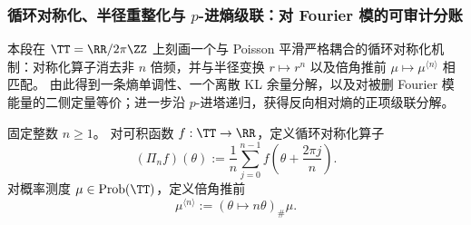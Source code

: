 \subsubsection{循环对称化、半径重整化与 \texorpdfstring{\(p\)}{p}-进熵级联：对 Fourier 模的可审计分账}\label{subsubsec:xi-reversekl-cyclic-symmetrization-padic-cascade}
本段在 \(\TT=\RR/2\pi\ZZ\) 上刻画一个与 Poisson 平滑严格耦合的循环对称化机制：对称化算子消去非 \(n\) 倍频，并与半径变换 \(r\mapsto r^n\) 以及倍角推前 \(\mu\mapsto \mu^{\langle n\rangle}\) 相匹配。
由此得到一条熵单调性、一个离散 KL 余量分解，以及对被删 Fourier 模能量的二侧定量等价；进一步沿 \(p\)-进塔递归，获得反向相对熵的正项级联分解。

\begin{definition}[循环对称化与倍角推前]\label{def:xi-reversekl-cyclic-symmetrization-pushforward}
固定整数 \(n\ge 1\)。
对可积函数 \(f:\TT\to\RR\)，定义循环对称化算子
\[
(\Pi_n f)(\theta):=\frac1n\sum_{j=0}^{n-1}f\!\left(\theta+\frac{2\pi j}{n}\right).
\]
对概率测度 \(\mu\in\mathrm{Prob}(\TT)\)，定义倍角推前
\[
\mu^{\langle n\rangle}:=(\theta\mapsto n\theta)_\#\mu.
\]
\end{definition}

